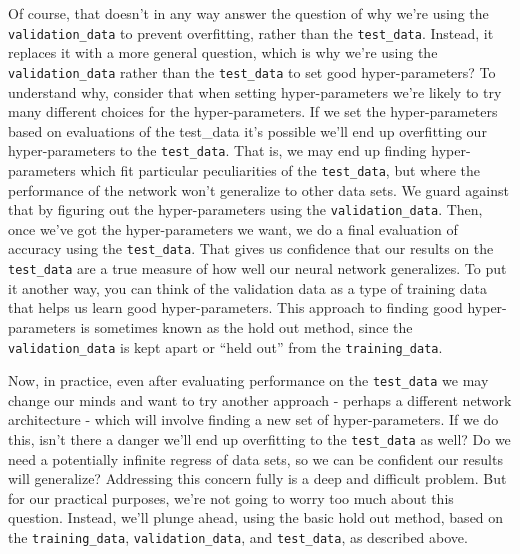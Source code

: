 \documentclass[a4paper,twoside,10pt]{book}
\begin{document}
Of course, that doesn't in any way answer the question of why we're using the \texttt{validation\_data} to prevent overfitting, rather than the \texttt{test\_data}. Instead, it replaces it with a more general question, which is why we're using the \texttt{validation\_data} rather than the \texttt{test\_data} to set good hyper-parameters? To understand why, consider that when setting hyper-parameters we're likely to try many different choices for the hyper-parameters. If we set the hyper-parameters based on evaluations of the test\_data it's possible we'll end up overfitting our hyper-parameters to the \texttt{test\_data}. That is, we may end up finding hyper-parameters which fit particular peculiarities of the \texttt{test\_data}, but where the performance of the network won't generalize to other data sets. We guard against that by figuring out the hyper-parameters using the \texttt{validation\_data}. Then, once we've got the hyper-parameters we want, we do a final evaluation of accuracy using the \texttt{test\_data}. That gives us confidence that our results on the \texttt{test\_data} are a true measure of how well our neural network generalizes. To put it another way, you can think of the validation data as a type of training data that helps us learn good hyper-parameters. This approach to finding good hyper-parameters is sometimes known as the hold out method, since the \texttt{validation\_data} is kept apart or ``held out'' from the \texttt{training\_data}.

Now, in practice, even after evaluating performance on the \texttt{test\_data} we may change our minds and want to try another approach - perhaps a different network architecture - which will involve finding a new set of hyper-parameters. If we do this, isn't there a danger we'll end up overfitting to the \texttt{test\_data} as well? Do we need a potentially infinite regress of data sets, so we can be confident our results will generalize? Addressing this concern fully is a deep and difficult problem. But for our practical purposes, we're not going to worry too much about this question. Instead, we'll plunge ahead, using the basic hold out method, based on the \texttt{training\_data}, \texttt{validation\_data}, and \texttt{test\_data}, as described above.
\end{document}
